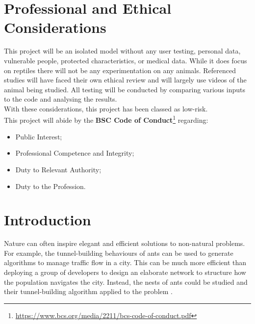 \documentclass{article}
\begin{document}
\section*{Professional and Ethical Considerations}
\label{sec:Ethics}
This project will be an isolated model without any user testing, personal data, vulnerable people, protected characteristics, or medical data. While it does focus on reptiles there will not be any experimentation on any animals. Referenced studies will have faced their own ethical review and will largely use videos of the animal being studied. All testing will be conducted by comparing various inputs to the code and analysing the results.\\
With these considerations, this project has been classed as low-risk.\\

This project will abide by the \textbf{BSC Code of Conduct}\footnote{\url{https://www.bcs.org/media/2211/bcs-code-of-conduct.pdf}} regarding:
\begin{itemize}
 \item Public Interest;
 \item Professional Competence and Integrity;
 \item Duty to Relevant Authority;
 \item Duty to the Profession.
 \end{itemize}

\makeatletter
\renewcommand\footnoterule{\kern-3\p@\hrule\@width\ifodd\value{page}6in\else6in\fi\kern2.6\p@}
\makeatother 

\newpage
\pagestyle{fancy}
\fancyhf{}
\tableofcontents

\newpage
\section{Introduction}
\label{sec:Introduction}
Nature can often inspire elegant and efficient solutions to non-natural problems. For example, the tunnel-building behaviours of ants can be used to generate algorithms to manage traffic flow in a city. This can be much more efficient than deploying a group of developers to design an elaborate network to structure how the population navigates the city. Instead, the nests of ants could be studied and their tunnel-building algorithm applied to the problem . \\
\end{document}
